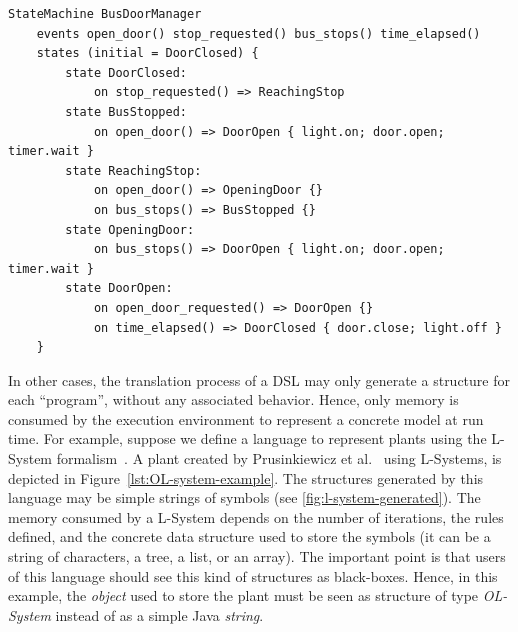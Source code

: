 
\begin{lstlisting}[caption={State machine to control the door of a bus.},label={lst:state-machine},style=statemachinelang,frame=single]
StateMachine BusDoorManager
	events open_door() stop_requested() bus_stops() time_elapsed() 
	states (initial = DoorClosed) {
		state DoorClosed:
			on stop_requested() => ReachingStop
		state BusStopped:
			on open_door() => DoorOpen { light.on; door.open; timer.wait }
		state ReachingStop:
			on open_door() => OpeningDoor {}
			on bus_stops() => BusStopped {}
		state OpeningDoor:
			on bus_stops() => DoorOpen { light.on; door.open; timer.wait }
		state DoorOpen:
			on open_door_requested() => DoorOpen {}
			on time_elapsed() => DoorClosed { door.close; light.off }
	}
\end{lstlisting}

In other cases, the translation process of a DSL may only generate a structure for each ``program'', without any associated behavior.
Hence, only memory is consumed by the execution environment to represent a concrete model at run time.
For example, suppose we define a language to represent plants using the L-System formalism~\cite{Prusinkiewicz1990}.
A plant created by Prusinkiewicz et al.~\cite{Prusinkiewicz1990} using L-Systems, is depicted in Figure~\ref{lst:OL-system-example}.
The structures generated by this language may be simple strings of symbols (see \ref{fig:l-system-generated}).
The memory consumed by a L-System depends on the number of iterations, the rules defined, and the concrete data structure used to store the symbols
(it can be a string of characters, a tree, a list, or an array).
The important point is that users of this language should see this kind of structures as black-boxes.
Hence, in this example, the \textit{object} used to store the plant must be seen as structure of type \textit{OL-System} instead of as a simple Java \textit{string}.  



